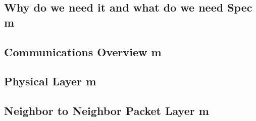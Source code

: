 \subsection{Why do we need it and what do we need Spec  m}

\subsection{Communications Overview m}

\subsection{Physical Layer m}

\subsection{Neighbor to Neighbor Packet Layer m}